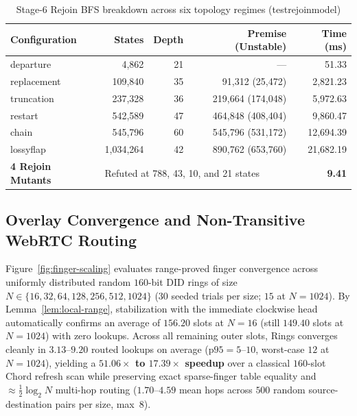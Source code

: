 \documentclass[journal]{IEEEtran}
\DeclareRobustCommand{\code}[1]{{\ttfamily\renewcommand{\_}{\textunderscore\allowbreak}#1}}
\begin{document}
\begin{table}[t]
\centering
\caption{Stage-6 Rejoin BFS breakdown across six topology regimes (\code{test\_rejoin\_model})}
\label{tab:rejoin-bfs}
\footnotesize
\setlength{\tabcolsep}{4pt}
\begin{tabular}{@{}lrrrr@{}}
\toprule
\textbf{Configuration} & \textbf{States} & \textbf{Depth} & \textbf{Premise (Unstable)} & \textbf{Time (ms)} \\
\midrule
\code{departure} & 4,862 & 21 & --- & 51.33 \\
\code{replacement} & 109,840 & 35 & 91,312 (25,472) & 2,821.23 \\
\code{truncation} & 237,328 & 36 & 219,664 (174,048) & 5,972.63 \\
\code{restart} & 542,589 & 47 & 464,848 (408,404) & 9,860.47 \\
\code{chain} & 545,796 & 60 & 545,796 (531,172) & 12,694.39 \\
\code{lossy\_flap} & 1,034,264 & 42 & 890,762 (653,760) & 21,682.19 \\
\midrule
\textbf{4 Rejoin Mutants} & \multicolumn{3}{l}{Refuted at 788, 43, 10, and 21 states} & \textbf{9.41} \\
\bottomrule
\end{tabular}
\end{table}

\subsection{Overlay Convergence and Non-Transitive WebRTC Routing}

Figure~\ref{fig:finger-scaling} evaluates range-proved finger convergence across uniformly distributed random $160$-bit DID rings of size $N\in\{16,32,64,128,256,512,1024\}$ ($30$ seeded trials per size; $15$ at $N=1024$). By Lemma~\ref{lem:local-range}, stabilization with the immediate clockwise head automatically confirms an average of $156.20$ slots at $N=16$ (still $149.40$ slots at $N=1024$) with zero lookups. Across all remaining outer slots, Rings converges cleanly in $\mathbf{3.13}$--$\mathbf{9.20}$ routed lookups on average ($\text{p95}=5$--$10$, worst-case $12$ at $N=1024$), yielding a \textbf{$51.06\times$ to $17.39\times$ speedup} over a classical $160$-slot Chord refresh scan while preserving exact sparse-finger table equality and $\approx\frac{1}{2}\log_2 N$ multi-hop routing ($1.70$--$4.59$ mean hops across $500$ random source-destination pairs per size, max~$8$).
\end{document}
